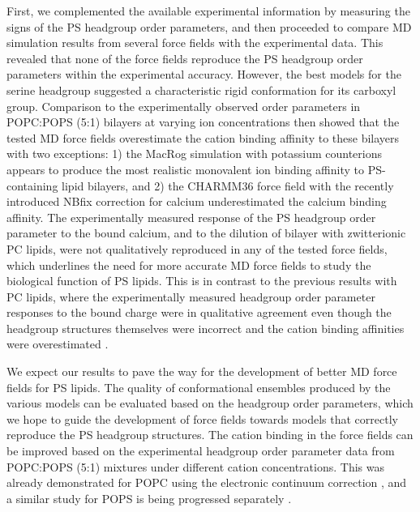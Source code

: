 \documentclass[aps,prl,superscriptaddress,twocolumn]{revtex4}
\begin{document}
First, we complemented the available experimental information \cite{browning80,roux90} by measuring the signs of the PS headgroup order parameters,
and then proceeded to compare MD simulation results from several force fields with the experimental data.
This revealed that none of the force fields
reproduce the PS headgroup order parameters within the experimental accuracy. However,
the best models for the serine headgroup suggested a characteristic rigid conformation for its
carboxyl group. Comparison to the experimentally observed order parameters in POPC:POPS (5:1) bilayers  at varying ion
concentrations \cite{roux90} then showed that the tested MD force fields
overestimate the cation binding affinity to these bilayers with two exceptions: 1) the MacRog simulation with potassium counterions appears to produce the most realistic monovalent ion binding
affinity to PS-containing lipid bilayers, and 2) the CHARMM36 force field with the recently introduced
NBfix correction for calcium \cite{kim16} underestimated the calcium binding affinity.
The experimentally measured response of the PS headgroup order parameter to the bound calcium, and to the dilution of bilayer with zwitterionic PC lipids, were not
qualitatively reproduced in any of the tested force fields, which underlines the need for more accurate
MD force fields to study the biological function of PS lipids.
This is in contrast to the previous results with PC lipids,
where the experimentally measured headgroup order parameter responses to the bound charge
were in qualitative agreement even though the headgroup structures themselves were
incorrect and the cation binding affinities were overestimated \cite{catte16}.

We expect our results to pave the way for the development of better MD force fields
for PS lipids. The quality of conformational ensembles produced by the various models can be evaluated based on the headgroup order parameters, which we hope to guide the development of force fields towards models that correctly reproduce the PS headgroup structures. The cation binding in the force fields can be improved based on the experimental headgroup order parameter data from POPC:POPS (5:1) mixtures under different cation concentrations. This was already demonstrated for POPC using the electronic continuum correction \cite{melcr18}, and a similar study for POPS is being progressed separately \cite{ECCpops}.


%
\end{document}
